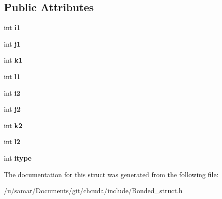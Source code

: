 \subsection*{Public Attributes}
\begin{DoxyCompactItemize}
\item 
\hypertarget{structcmap__t_afa1ac5166d5a45e7f849af0cb245e9a1}{}\label{structcmap__t_afa1ac5166d5a45e7f849af0cb245e9a1} 
int {\bfseries i1}
\item 
\hypertarget{structcmap__t_a75763376f982e5a9ff2ef021fd30b7cf}{}\label{structcmap__t_a75763376f982e5a9ff2ef021fd30b7cf} 
int {\bfseries j1}
\item 
\hypertarget{structcmap__t_a78dc9ff3b570c0774862701efe1b6abb}{}\label{structcmap__t_a78dc9ff3b570c0774862701efe1b6abb} 
int {\bfseries k1}
\item 
\hypertarget{structcmap__t_acd54c067a599d29ddfd73dc91bd108bd}{}\label{structcmap__t_acd54c067a599d29ddfd73dc91bd108bd} 
int {\bfseries l1}
\item 
\hypertarget{structcmap__t_aac8bbf73be594be350c2743380eec472}{}\label{structcmap__t_aac8bbf73be594be350c2743380eec472} 
int {\bfseries i2}
\item 
\hypertarget{structcmap__t_ae594b462d28f477330db89b66dacc787}{}\label{structcmap__t_ae594b462d28f477330db89b66dacc787} 
int {\bfseries j2}
\item 
\hypertarget{structcmap__t_a329b6c8ac2e8bd17306007e48cf035a7}{}\label{structcmap__t_a329b6c8ac2e8bd17306007e48cf035a7} 
int {\bfseries k2}
\item 
\hypertarget{structcmap__t_a268972775606cce00293eb3706caf765}{}\label{structcmap__t_a268972775606cce00293eb3706caf765} 
int {\bfseries l2}
\item 
\hypertarget{structcmap__t_aa6bbaa56f765a429edd04fd2cf17f618}{}\label{structcmap__t_aa6bbaa56f765a429edd04fd2cf17f618} 
int {\bfseries itype}
\end{DoxyCompactItemize}


The documentation for this struct was generated from the following file\+:\begin{DoxyCompactItemize}
\item 
/u/samar/\+Documents/git/chcuda/include/Bonded\+\_\+struct.\+h\end{DoxyCompactItemize}
